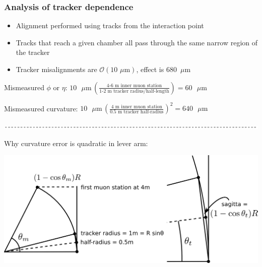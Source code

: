 \documentclass[compress]{beamer}
\begin{document}
\begin{frame}
\frametitle{Analysis of tracker dependence}
\small

\begin{itemize}
\item Alignment performed using tracks from the interaction point
\item Tracks that reach a given chamber all pass through the same narrow region of the tracker
\item Tracker misalignments are $\mathcal{O}(\mbox{10 $\mu$m})$, effect is 680~$\mu$m
\end{itemize}

Mismeasured $\phi$ or $\eta$: \hfill \mbox{$\displaystyle 10\mbox{ $\mu$m}\, \left(\frac{\mbox{4-6 m inner muon station}}{\mbox{1-2 m tracker radius/half-length}}\right) = 60\mbox{ $\mu$m}$ \hspace{-0.3 cm}}

\vspace{0.2 cm}
Mismeasured curvature: \hfill $\displaystyle 10\mbox{ $\mu$m}\, \left(\frac{\mbox{4 m inner muon station}}{\mbox{0.5 m tracker half-radius}}\right)^2 = 640\mbox{ $\mu$m}$

\vspace{0.2 cm}
\includegraphics[width=\linewidth]{dotted-line.pdf}

\vspace{-0.2 cm}
\begin{center}
\hspace{0.5 cm} \scriptsize Why curvature error is quadratic in lever arm: \hfill \mbox{ }

\includegraphics[width=0.7\linewidth]{curvature_extrapolation.png}
\end{center}
\end{frame}
\end{document}

